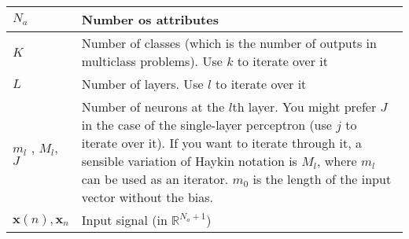 \documentclass{article}
\begin{document}
\begin{xltabular}{\textwidth}{XX}
	\(N_a\)                                                                                                                                                                        & Number os attributes                                                                                                                                                                                                                                                                                                                   \\ \hline
	\(K\) \cite{bishopPatternRecognitionMachine2006}                                                                                                                               & Number of classes (which is the number of outputs in multiclass problems). Use \(k\) to iterate over it                                                                                                                                                                                                                                \\ \hline
	\(L\)                                                                                                                                                                          & Number of layers. Use \(l\) to iterate over it                                                                                                                                                                                                                                                                                         \\ \hline
	\(m_l\) \cite{bishopPatternRecognitionMachine2006}, \(M_l\), \(J\) \cite{bishopPatternRecognitionMachine2006}                                                                  & Number of neurons at the \(l\)th layer. You might prefer \(J\) in the case of the single-layer perceptron (use \(j\) to iterate over it). If you want to iterate through it, a sensible variation of Haykin notation is \(M_l\), where \(m_l\) can be used as an iterator. \(m_0\) is the length of the input vector without the bias. \\ \hline
	\(\mathbf{x}(n), \mathbf{x}_n\)                                                                                                                                                & Input signal (in \(\mathbb{R}^{N_a + 1}\))                                                                                                                                                                                                                                                                                             \\ \hline

\end{xltabular}
\end{document}
